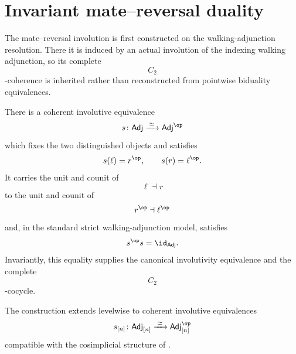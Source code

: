 \section{Invariant mate--reversal duality}
\label{sec:invariant-mate-reversal-duality}

The mate--reversal involution is first constructed on the
walking-adjunction resolution. There it is induced by an actual
involution of the indexing walking adjunction, so its complete
\[
    C_2
\]
-coherence is inherited rather than reconstructed from pointwise
biduality equivalences.

\begin{lemma}
\label{lem:walking-adjunction-leg-reversal}
There is a coherent involutive equivalence
\[
    s
    \colon
    \mathsf{Adj}
    \xrightarrow{\;\simeq\;}
    \mathsf{Adj}^{\op}
\]
which fixes the two distinguished objects and satisfies
\[
    s(\ell)=r^{\op},
    \qquad
    s(r)=\ell^{\op}.
\]
It carries the unit and counit of
\[
    \ell\dashv r
\]
to the unit and counit of
\[
    r^{\op}\dashv\ell^{\op}
\]
and, in the standard strict walking-adjunction model, satisfies
\[
    s^{\op}s
    =
    \id_{\mathsf{Adj}}.
\]
Invariantly, this equality supplies the canonical involutivity
equivalence and the complete
\[
    C_2
\]
-cocycle.

The construction extends levelwise to coherent involutive equivalences
\[
    s_{[n]}
    \colon
    \mathsf{Adj}_{[n]}
    \xrightarrow{\;\simeq\;}
    \mathsf{Adj}_{[n]}^{\op}
\]
compatible with the cosimplicial structure of
.
\end{lemma}

